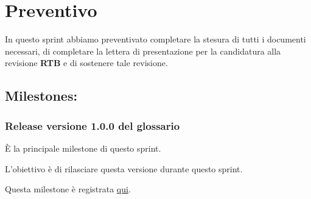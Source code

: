 \section{Preventivo}

In questo sprint abbiamo preventivato completare la stesura di tutti i documenti necessari, di completare la lettera di presentazione per la candidatura alla revisione \textbf{RTB} e di sostenere tale revisione.

\subsection{Milestones:}  
\subsubsection{Release versione 1.0.0 del glossario}

È la principale milestone di questo sprint.

L'obiettivo è di rilasciare questa versione durante questo sprint.

Questa milestone è registrata \href{https://github.com/SWEasabi/glossario/milestone/1}{qui}.